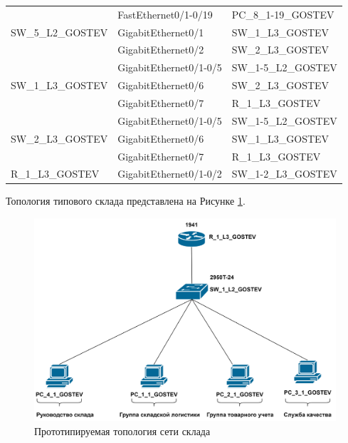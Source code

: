 \documentclass[14pt, a4paper]{extarticle}
\numberwithin{equation}{section}
\begin{document}
\begin{table}[H]
\begin{tabular}{|l|l|l|}
\multirow{3}{*}{SW\_5\_L2\_GOSTEV} & FastEthernet0/1-0/19   & PC\_8\_1-19\_GOSTEV           \\ \cline{2-3} 
                                   & GigabitEthernet0/1     & SW\_1\_L3\_GOSTEV             \\ \cline{2-3} 
                                   & GigabitEthernet0/2     & SW\_2\_L3\_GOSTEV             \\ \hline
\multirow{3}{*}{SW\_1\_L3\_GOSTEV} & GigabitEthernet0/1-0/5 & SW\_1-5\_L2\_GOSTEV           \\ \cline{2-3} 
                                   & GigabitEthernet0/6     & SW\_2\_L3\_GOSTEV             \\ \cline{2-3} 
                                   & GigabitEthernet0/7     & R\_1\_L3\_GOSTEV              \\ \hline
\multirow{3}{*}{SW\_2\_L3\_GOSTEV} & GigabitEthernet0/1-0/5 & SW\_1-5\_L2\_GOSTEV           \\ \cline{2-3} 
                                   & GigabitEthernet0/6     & SW\_1\_L3\_GOSTEV             \\ \cline{2-3} 
                                   & GigabitEthernet0/7     & R\_1\_L3\_GOSTEV              \\ \hline
R\_1\_L3\_GOSTEV                   & GigabitEthernet0/1-0/2 & SW\_1-2\_L3\_GOSTEV           \\ \hline
\end{tabular}
\end{table}



Топология типового склада представлена на Рисунке \ref{fig:warehouseTopo}.
\begin{figure}[H]
        \centering
        \includegraphics[scale=0.2]{topo_warehouse.png}
        \caption{Прототипируемая топология сети склада}
        \label{fig:warehouseTopo}
\end{figure}
\end{document}
